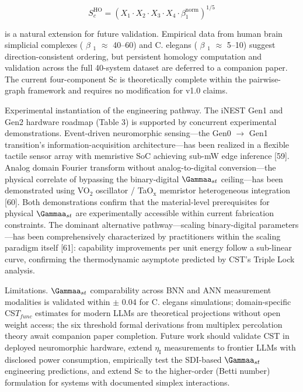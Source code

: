 \documentclass[a4paper,12pt]{article}
\providecommand{\textsubscript}[1]{\ensuremath{_{\text{#1}}}}
\begin{document}
\begin{equation}
S_c^{\text{HO}} = (X_1 \cdot X_2 \cdot X_3 \cdot X_4 \cdot \beta_1^{\text{norm}})^{1/5}
\end{equation}

is a natural extension for future validation. Empirical data from human brain simplicial complexes ( $\beta$ \textsubscript{1}  $\approx$  40--60) and C. elegans ( $\beta$ \textsubscript{1}  $\approx$  5--10) suggest direction-consistent ordering, but persistent homology computation and validation across the full 40-system dataset are deferred to a companion paper. The current four-component Sc is theoretically complete within the pairwise-graph framework and requires no modification for v1.0 claims.

Experimental instantiation of the engineering pathway.
The iNEST Gen1 and Gen2 hardware roadmap (Table 3) is supported by concurrent experimental demonstrations.
Event-driven neuromorphic sensing---the Gen0 $\rightarrow$ Gen1 transition's information-acquisition architecture---has been realized in a flexible tactile sensor array with memristive SoC achieving sub-mW edge inference [59].
Analog domain Fourier transform without analog-to-digital conversion---the physical correlate of bypassing the binary-digital $\Gammaa_{st}$ ceiling---has been demonstrated using VO\textsubscript{2} oscillator / TaO\textsubscript{x} memristor heterogeneous integration [60].
Both demonstrations confirm that the material-level prerequisites for physical $\Gammaa_{st}$ are experimentally accessible within current fabrication constraints.
The dominant alternative pathway---scaling binary-digital parameters---has been comprehensively characterized by practitioners within the scaling paradigm itself [61]: capability improvements per unit energy follow a sub-linear curve, confirming the thermodynamic asymptote predicted by CST's Triple Lock analysis.

Limitations. $\Gammaa_{st}$ comparability across BNN and ANN measurement modalities is validated within  $\pm$ 0.04 for C. elegans simulations; domain-specific CS$T_{func}$ estimates for modern LLMs are theoretical projections without open weight access; the six threshold formal derivations from multiplex percolation theory await companion paper completion.
Future work should validate CST in deployed neuromorphic hardware, extend $\eta_{\text{I}}$ measurements to frontier LLMs with disclosed power consumption, empirically test the SDI-based $\Gammaa_{st}$ engineering predictions, and extend Sc to the higher-order (Betti number) formulation for systems with documented simplex interactions.
\end{document}
